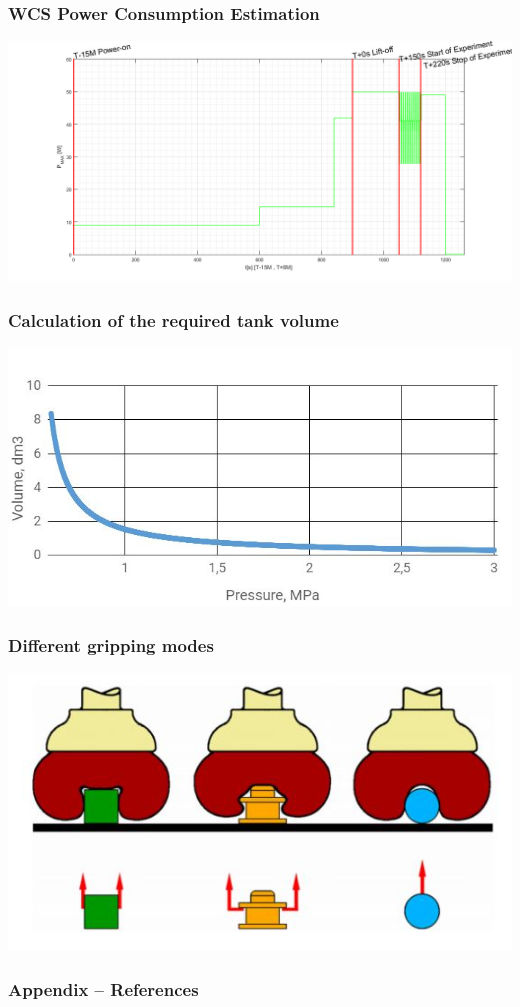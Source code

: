 \documentclass[xcolor=dvipsnames]{beamer}%
\begin{document}
\appendix


\begin{frame}
\frametitle{WCS Power Consumption Estimation}
\centering
\includegraphics[width=\linewidth] {figure/PeakConsumptionDiagram.png}
\end{frame}

\begin{frame}
\frametitle{Calculation of the required tank volume}
\centering
\includegraphics[width=\linewidth] {figure/TANK.JPG}
\end{frame}

\begin{frame}
\frametitle{Different gripping modes}
\centering
\includegraphics[width=\linewidth] {figure/catching.JPG}
\end{frame}


\begin{frame}[allowframebreaks]
        \frametitle{Appendix -- References}
        \nocite{*} 
        
        
\end{frame}
	
\end{document}
